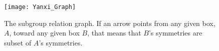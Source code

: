 \begin{figure}[!ht]
\centering
\texttt{[image: Yanxi\_Graph]}
\caption{The subgroup relation graph. If an arrow points from any given box, $A$, toward any given box $B$, that means that $B$'s symmetries are subset of $A$'s symmetries.}
\label{graph}
\end{figure}